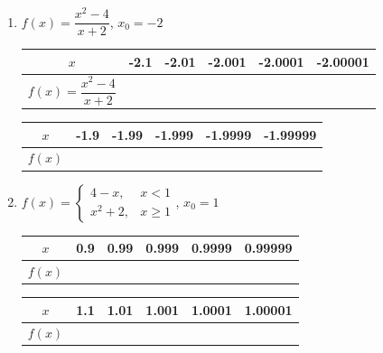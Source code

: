 \documentclass[12pt]{report}
\begin{document}
\begin{enumerate}
\begin{enumerate}
          \item $f (x) = \dfrac{x^2 - 4}{x + 2}$, $x_0 = -2$
                \begin{center}
                  \begin{tabular}{|c|c|c|c|c|c|}
                    \hline
                    $x$                              & -2.1 & -2.01 & -2.001 & -2.0001 & -2.00001 \\
                    \hline
                    $f (x) = \dfrac{x^2 - 4}{x + 2}$ &      &       &        &         &          \\
                    \hline
                  \end{tabular}
                  \vskip 0.2cm
                  \begin{tabular}{|c|c|c|c|c|c|}
                    \hline
                    $x$     & -1.9 & -1.99 & -1.999 & -1.9999 & -1.99999 \\
                    \hline
                    $f (x)$ &      &       &        &         &          \\
                    \hline
                  \end{tabular}
                \end{center}

          \item $f (x) = \left\{\begin{array}{rl}
                    4 - x,   & x < 1    \\
                    x^2 + 2, & x \geq 1
                  \end{array}\right.$, $x_0 = 1$
                \begin{center}
                  \begin{tabular}{|c|c|c|c|c|c|}
                    \hline
                    $x$     & 0.9 & 0.99 & 0.999 & 0.9999 & 0.99999 \\
                    \hline
                    $f (x)$ &     &      &       &        &         \\
                    \hline
                  \end{tabular}
                  \vskip 0.2cm
                  \begin{tabular}{|c|c|c|c|c|c|}
                    \hline
                    $x$     & 1.1 & 1.01 & 1.001 & 1.0001 & 1.00001 \\
                    \hline
                    $f (x)$ &     &      &       &        &         \\
                    \hline
                  \end{tabular}
                \end{center}
        \end{enumerate}


\end{enumerate}
\end{document}
